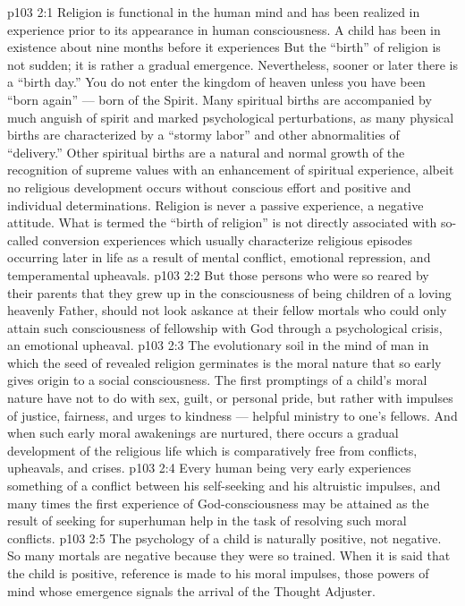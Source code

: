 \vs p103 2:1 Religion is functional in the human mind and has been realized in experience prior to its appearance in human consciousness. A child has been in existence about nine months before it experiences  But the “birth” of religion is not sudden; it is rather a gradual emergence. Nevertheless, sooner or later there is a “birth day.” You do not enter the kingdom of heaven unless you have been “born again” --- born of the Spirit. Many spiritual births are accompanied by much anguish of spirit and marked psychological perturbations, as many physical births are characterized by a “stormy labor” and other abnormalities of “delivery.” Other spiritual births are a natural and normal growth of the recognition of supreme values with an enhancement of spiritual experience, albeit no religious development occurs without conscious effort and positive and individual determinations. Religion is never a passive experience, a negative attitude. What is termed the “birth of religion” is not directly associated with so\hyp{}called conversion experiences which usually characterize religious episodes occurring later in life as a result of mental conflict, emotional repression, and temperamental upheavals.
\vs p103 2:2 But those persons who were so reared by their parents that they grew up in the consciousness of being children of a loving heavenly Father, should not look askance at their fellow mortals who could only attain such consciousness of fellowship with God through a psychological crisis, an emotional upheaval.
\vs p103 2:3 The evolutionary soil in the mind of man in which the seed of revealed religion germinates is the moral nature that so early gives origin to a social consciousness. The first promptings of a child’s moral nature have not to do with sex, guilt, or personal pride, but rather with impulses of justice, fairness, and urges to kindness --- helpful ministry to one’s fellows. And when such early moral awakenings are nurtured, there occurs a gradual development of the religious life which is comparatively free from conflicts, upheavals, and crises.
\vs p103 2:4 Every human being very early experiences something of a conflict between his self\hyp{}seeking and his altruistic impulses, and many times the first experience of God\hyp{}consciousness may be attained as the result of seeking for superhuman help in the task of resolving such moral conflicts.
\vs p103 2:5 The psychology of a child is naturally positive, not negative. So many mortals are negative because they were so trained. When it is said that the child is positive, reference is made to his moral impulses, those powers of mind whose emergence signals the arrival of the Thought Adjuster.
